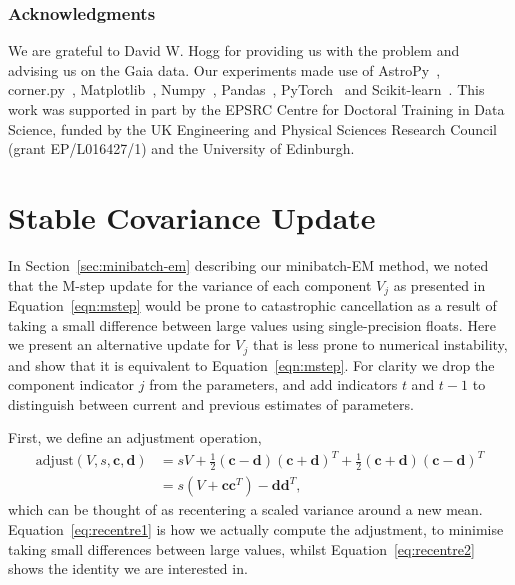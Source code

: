 \documentclass{article}
\newcommand{\bc}{\mathbf{c}}
\newcommand{\bd}{\mathbf{d}}
\begin{document}
\subsubsection*{Acknowledgments}
We are grateful to David W. Hogg for providing us with the problem and advising us on the Gaia data.
Our experiments made use of AstroPy~\citep{astropy:2013,astropy:2018}, corner.py~\citep{corner}, Matplotlib~\citep{Hunter:2007}, Numpy~\citep{numpy}, Pandas~\citep{mckinney-proc-scipy-2010}, PyTorch~\citep{paszke2017automatic} and Scikit-learn~\citep{scikit-learn}.
This work was supported in part by the EPSRC Centre for Doctoral Training in Data Science, funded by the UK Engineering and Physical Sciences Research Council (grant EP/L016427/1) and the University of Edinburgh.


%
%



\appendix

\section{Stable Covariance Update}
\label{apx:variance-rewrite}

In Section~\ref{sec:minibatch-em} describing our minibatch-EM method, we noted that the M-step update for the variance of each component $V_j$ as presented in Equation~\ref{eqn:mstep} would be prone to catastrophic cancellation as a result of taking a small difference between large values using single-precision floats.
Here we present an alternative update for $V_j$ that is less prone to numerical instability, and show that it is equivalent to Equation~\ref{eqn:mstep}.
For clarity we drop the component indicator $j$ from the parameters, and add indicators $t$ and $t-1$ to distinguish between current and previous estimates of parameters.

First, we define an adjustment operation,
\begin{align}
  \text{adjust}(V, s, \bc, \bd) &= sV + \frac{1}{2}(\bc - \bd)(\bc + \bd)^T + \frac{1}{2}(\bc + \bd)(\bc - \bd)^T  \label{eq:recentre1} \\
  &= s(V + \bc\bc^T) - \bd\bd^T,\label{eq:recentre2}
\end{align}
which can be thought of as recentering a scaled variance around a new mean.
Equation~\ref{eq:recentre1} is how we actually compute the adjustment, to minimise taking small differences between large values, whilst Equation~\ref{eq:recentre2} shows the identity we are interested in.
\end{document}
